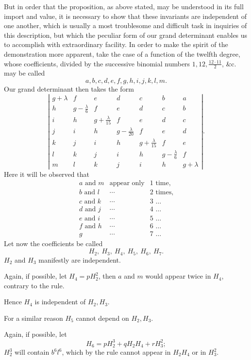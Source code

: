 \documentclass[11pt]{article}
\newcommand{\sourcepage}[1]{\marginpar{\scriptsize p.~#1}}
\begin{document}
But in order that the proposition, as above stated, may be understood in its full import and value, it is necessary to show that these invariants are independent of one another, which is usually a most troublesome and difficult task in inquiries of this description, but which the peculiar form of our grand determinant enables us to accomplish with extraordinary facility. In order to make the spirit of the demonstration more apparent, take the case of a function of the twelfth degree, whose coefficients, divided by the successive binomial numbers $1,12,\frac{12\cdot11}{2}$, \&c. may be called
\[
a,b,c,d,e,f,g,h,i,j,k,l,m.
\]
\sourcepage{278}
Our grand determinant then takes the form
\[
\left|\begin{array}{ccccccc}
g+\lambda&f&e&d&c&b&a\\
h&g-\frac{\lambda}{6}&f&e&d&c&b\\
i&h&g+\frac{\lambda}{15}&f&e&d&c\\
j&i&h&g-\frac{\lambda}{20}&f&e&d\\
k&j&i&h&g+\frac{\lambda}{15}&f&e\\
l&k&j&i&h&g-\frac{\lambda}{6}&f\\
m&l&k&j&i&h&g+\lambda
\end{array}\right|.
\]
Here it will be observed that
\[
\begin{array}{rcl}
a\text{ and }m&\text{appear only}&1\text{ time,}\\
b\text{ and }l&\cdots&2\text{ times,}\\
c\text{ and }k&\cdots&3\text{ \ldots}\\
d\text{ and }j&\cdots&4\text{ \ldots}\\
e\text{ and }i&\cdots&5\text{ \ldots}\\
f\text{ and }h&\cdots&6\text{ \ldots}\\
g&\cdots&7\text{ \ldots}
\end{array}
\]
Let now the coefficients be called
\[
H_2,\ H_3,\ H_4,\ H_5,\ H_6,\ H_7.
\]
$H_2$ and $H_3$ manifestly are independent.

Again, if possible, let $H_4=pH_2^2$, then $a$ and $m$ would appear twice in $H_4$, contrary to the rule.

Hence $H_4$ is independent of $H_2,H_3$.

For a similar reason $H_5$ cannot depend on $H_2,H_3$.

Again, if possible, let
\[
H_6=pH_2^3+qH_2H_4+rH_3^2;
\]
$H_2^3$ will contain $b^6l^6$, which by the rule cannot appear in $H_2H_4$ or in $H_3^2$.
\end{document}

